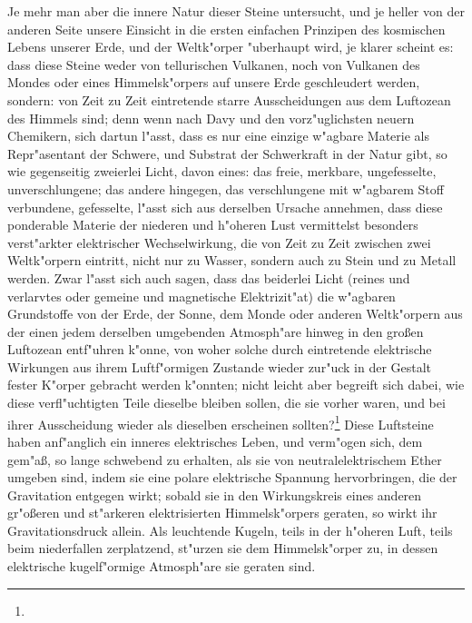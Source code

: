 \documentclass[a4paper, 11pt, oneside, polutonikogreek, german]{article}
\begin{document}
Je mehr man aber die innere Natur dieser Steine untersucht, und je heller von der anderen Seite unsere Einsicht in die ersten einfachen Prinzipen des kosmischen Lebens unserer Erde, und der Weltk"orper "uberhaupt wird, je klarer scheint es: dass diese Steine weder von tellurischen Vulkanen, noch von Vulkanen des Mondes oder eines Himmelsk"orpers auf unsere Erde geschleudert werden, sondern: von Zeit zu Zeit eintretende starre Ausscheidungen aus dem Luftozean des Himmels sind; denn wenn nach Davy und den vorz"uglichsten neuern Chemikern, sich dartun l"asst, dass es nur eine einzige w"agbare Materie als Repr"asentant der Schwere, und Substrat der Schwerkraft in der Natur gibt, so wie gegenseitig zweierlei Licht, davon eines: das freie, merkbare, ungefesselte, unverschlungene; das andere hingegen, das verschlungene mit w"agbarem Stoff verbundene, gefesselte, l"asst sich aus derselben Ursache annehmen, dass diese ponderable Materie der niederen und h"oheren Lust vermittelst besonders verst"arkter elektrischer Wechselwirkung, die von Zeit zu Zeit zwischen zwei Weltk"orpern eintritt, nicht nur zu Wasser, sondern auch zu Stein und zu Metall werden. Zwar l"asst sich auch sagen, dass das beiderlei Licht (reines und verlarvtes oder gemeine und magnetische Elektrizit"at) die w"agbaren Grundstoffe von der Erde, der Sonne, dem Monde oder anderen Weltk"orpern aus der einen jedem derselben umgebenden Atmosph"are hinweg in den großen Luftozean entf"uhren k"onne, von woher solche durch eintretende elektrische Wirkungen aus ihrem Luftf"ormigen Zustande wieder zur"uck in der Gestalt fester K"orper gebracht werden k"onnten; nicht leicht aber begreift sich dabei, wie diese verfl"uchtigten Teile dieselbe bleiben sollen, die sie vorher waren, und bei ihrer Ausscheidung wieder als dieselben erscheinen sollten?\footnote{} Diese Luftsteine haben anf"anglich ein inneres elektrisches Leben, und verm"ogen sich, dem gem"aß, so lange schwebend zu erhalten, als sie von neutralelektrischem Ether umgeben sind, indem sie eine polare elektrische Spannung hervorbringen, die der Gravitation entgegen wirkt; sobald sie in den Wirkungskreis eines anderen gr"oßeren und st"arkeren elektrisierten Himmelsk"orpers geraten, so wirkt ihr Gravitationsdruck allein. Als leuchtende Kugeln, teils in der h"oheren Luft, teils beim niederfallen zerplatzend, st"urzen sie dem Himmelsk"orper zu, in dessen elektrische kugelf"ormige Atmosph"are sie geraten sind.
\end{document}
